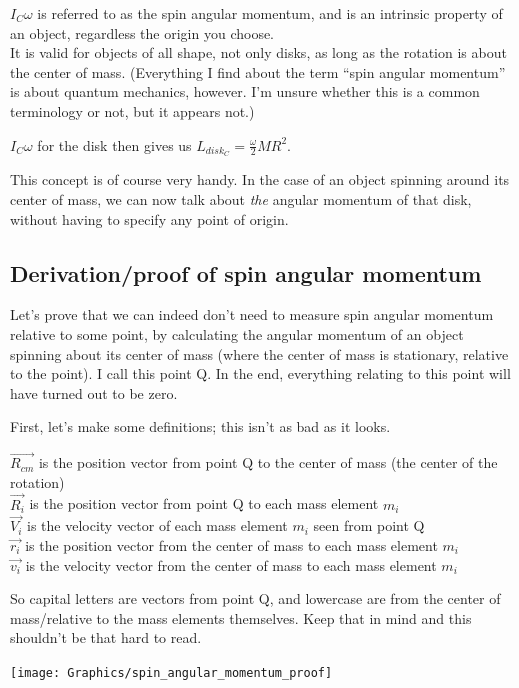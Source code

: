 \documentclass[8.01x]{subfiles}
\begin{document}
$I_C \omega$ is referred to as the spin angular momentum, and is an intrinsic property of an object, regardless the origin you choose.\\
It is valid for objects of all shape, not only disks, as long as the rotation is about the center of mass.
(Everything I find about the term ``spin angular momentum'' is about quantum mechanics, however. I'm unsure whether this is a common terminology or not, but it appears not.)

$I_C \omega$ for the disk then gives us $\displaystyle L_{disk_C} = \frac{\omega}{2} M R^2$.

This concept is of course very handy. In the case of an object spinning around its center of mass, we can now talk about \emph{the} angular momentum of that disk, without having to specify any point of origin.

\subsection{Derivation/proof of spin angular momentum}

Let's prove that we can indeed don't need to measure spin angular momentum relative to some point, by calculating the angular momentum of an object spinning about its center of mass (where the center of mass is stationary, relative to the point). I call this point Q. In the end, everything relating to this point will have turned out to be zero.

First, let's make some definitions; this isn't as bad as it looks.

$\vec{R_{cm}}$ is the position vector from point Q to the center of mass (the center of the rotation)\\
$\vec{R_i}$ is the position vector from point Q to each mass element $m_i$\\
$\vec{V_i}$ is the velocity vector of each mass element $m_i$ seen from point Q\\
$\vec{r_i}$ is the position vector from the center of mass to each mass element $m_i$\\
$\vec{v_i}$ is the velocity vector from the center of mass to each mass element $m_i$

So capital letters are vectors from point Q, and lowercase are from the center of mass/relative to the mass elements themselves. Keep that in mind and this shouldn't be that hard to read.

\begin{center}
\texttt{[image: Graphics/spin\_angular\_momentum\_proof]}
\end{center}
\end{document}
